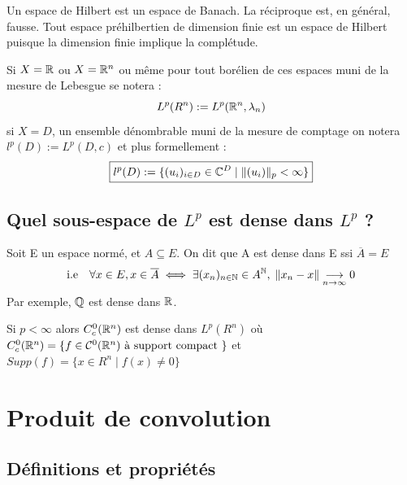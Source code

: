 \begin{remark}
    Un espace de Hilbert est un espace de Banach. La réciproque est, en général, fausse. 
    Tout espace préhilbertien de dimension finie est un espace de Hilbert puisque la dimension finie implique la complétude. 
\end{remark}

\begin{example}
    Si $X = \mathbb{R}$ ou $X = \mathbb{R}^n$ ou même pour tout borélien de ces espaces muni de la mesure de Lebesgue se notera :
        \[ L^p(R^n) := L^p(\mathbb{R}^n, \lambda_n) \] 
    si $X = D$, un ensemble dénombrable muni de la mesure de comptage on notera $l^p(D) := L^p(D,c)$ et plus formellement :
        \[ \boxed{ l^p(D) := \{ (u_i)_{i \in D} \in \mathbb{C}^D \; | \; \|(u_i)\|_p < \infty \} }\] 
\end{example}

\newpage

\subsection{Quel sous-espace de $L^p$ est dense dans $L^p$ ?}

\begin{remark}
    Soit E un espace normé, et $A \subseteq E$. 
    On dit que A est dense dans E ssi $\overline{A} = E$ 
    \[ \text{i.e} \quad 
        \forall x \in E, x \in \overline{A} \; 
        \Longleftrightarrow \; \exists (x_n)_{n \in \mathbb{N}} \in A^{\mathbb{N}}, \; \| x_n - x \| \underset{n \to \infty}{\longrightarrow} 0 
    \] 
    Par exemple, $\mathbb{Q}$ est dense dans $\mathbb{R}$. 
\end{remark}

\begin{theorem}
    Si $p < \infty$ alors $C^0_c(\mathbb{R}^n)$ est dense dans $L^p(R^n)$ 
    où $C^0_c(\mathbb{R}^n) = \{f \in \mathcal{C}^0(\mathbb{R}^n) \text{ à support compact }\} $ 
    et $ Supp(f) = \{x \in R^n \; | \; f(x) \not = 0\}$ 
\end{theorem}


\section{Produit de convolution}

\subsection{Définitions et propriétés}

